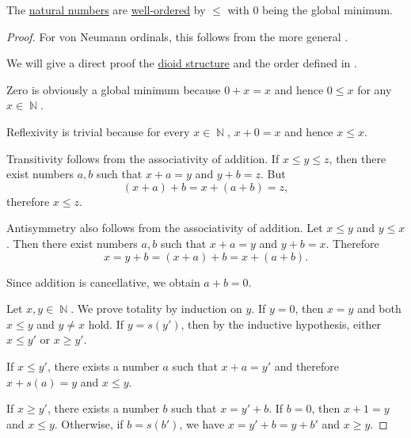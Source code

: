 \begin{proposition}\label{thm:natural_numbers_are_well_ordered}
  The \hyperref[def:natural_numbers]{natural numbers} are \hyperref[def:well_ordered_set]{well-ordered} by \hyperref[def:natural_number_ordering]{\( \leq \)} with \( 0 \) being the global minimum.
\end{proposition}
\begin{proof}
  For von Neumann ordinals, this follows from the more general .

  We will give a direct proof the \hyperref[thm:natural_numbers_form_dioid]{dioid structure} and the order defined in .

  Zero is obviously a global minimum because \( 0 + x = x \) and hence \( 0 \leq x \) for any \( x \in \BbbN \).

   Reflexivity is trivial because for every \( x \in \BbbN \), \( x + 0 = x \) and hence \( x \leq x \).

   Transitivity follows from the associativity of addition. If \( x \leq y \leq z \), then there exist numbers \( a, b \) such that \( x + a = y \) and \( y + b = z \). But
  \begin{equation*}
    (x + a) + b = x + (a + b) = z,
  \end{equation*}
  therefore \( x \leq z \).

   Antisymmetry also follows from the associativity of addition. Let \( x \leq y \) and \( y \leq x \). Then there exist numbers \( a, b \) such that \( x + a = y \) and \( y + b = x \). Therefore
  \begin{equation*}
    x = y + b = (x + a) + b = x + (a + b).
  \end{equation*}

  Since addition is cancellative, we obtain \( a + b = 0 \).

   Let \( x, y \in \BbbN \). We prove totality by induction on \( y \). If \( y = 0 \), then \( x = y \) and both \( x \leq y \) and \( y \neq x \) hold. If \( y = s(y') \), then by the inductive hypothesis, either \( x \leq y' \) or \( x \geq y' \).

  If \( x \leq y' \), there exists a number \( a \) such that \( x + a = y' \) and therefore \( x + s(a) = y \) and \( x \leq y \).

  If \( x \geq y' \), there exists a number \( b \) such that \( x = y' + b \). If \( b = 0 \), then \( x + 1 = y \) and \( x \leq y \). Otherwise, if \( b = s(b') \), we have \( x = y' + b = y + b' \) and \( x \geq y \).


\end{proof}
